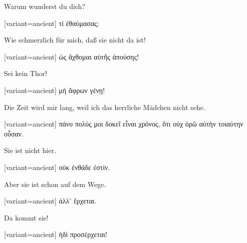 Warum wunderst du dich? 

\switchcolumn

\begin{greek}[variant=ancient]%
τί ἐθαύμασας;

\end{greek}%
\switchcolumn*

Wie schmerzlich für mich, daß sie nicht da ist! 

\switchcolumn

\begin{greek}[variant=ancient]%
ὡς ἄχθομαι αὐτῆς ἀπούσης!

\end{greek}%
\switchcolumn*

Sei kein Thor! 

\switchcolumn

\begin{greek}[variant=ancient]%
μὴ ἄφρων γένῃ!

\end{greek}%
\switchcolumn*

Die Zeit wird mir lang, weil ich das herrliche Mädchen nicht sehe. 

\switchcolumn

\begin{greek}[variant=ancient]%
πάνυ πολύς μοι δοκεῖ εἶναι χρόνος, ὅτι οὐχ ὁρῶ αὑτὴν τοιαύτην οὖσαν.

\end{greek}%
\switchcolumn*

Sie ist nicht hier. 

\switchcolumn

\begin{greek}[variant=ancient]%
οὐκ ἐνθάδε ἐστίν.

\end{greek}%
\switchcolumn*

Aber sie ist schon auf dem Wege. 

\switchcolumn

\begin{greek}[variant=ancient]%
ἀλλ' ἔρχεται.

\end{greek}%
\switchcolumn*

Da kommt sie! 

\switchcolumn

\begin{greek}[variant=ancient]%
ἡδὶ προσέρχεται!

\end{greek}%
\switchcolumn*

